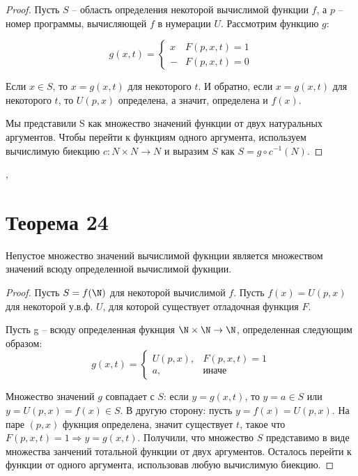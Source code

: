 \documentclass[a4paper,12pt]{article}
\begin{document}
    \begin{proof}
        Пусть $S$ -- область определения некоторой вычислимой функции $f$, а $p$ -- номер программы, вычисляющей $f$ в нумерации $U$. Рассмотрим функцию $g$:
        
        \begin{equation*}
        g(x, t) = 
        \begin{cases} 
        x & F(p, x, t) = 1\\
        -& F(p, x, t) = 0
        \end{cases}
        \end{equation*}
        
        Если $x \in S$, то $x = g(x, t)$ для некоторого $t$. И обратно, если $x = g(x, t)$ для
        некоторого $t$, то $U(p, x)$ определена, а значит, определена и $f(x)$.
        
        Мы представили S как множество значений функции от двух натуральных аргументов. Чтобы перейти к 
        функциям одного аргумента, используем вычислимую биекцию $c : N \times N \rightarrow N$ и выразим $S$ как $S = g \circ c^{-1}(N)$.
    \end{proof}
    \sep
    \section{Теорема 24}
    \begin{theorem}
        Непустое множество значений вычислимой фукнции является множеством значений всюду определенной вычислимой фукнции.
    \end{theorem}
    \begin{proof}
        Пусть $S = f(\N)$ для некоторой вычислимой $f$. Пусть $f(x) = U(p, x)$ для некоторой у.в.ф. $U$, для которой существует отладочная функция $F$.
        
        Пусть g -- всюду определенная фукнция $\N \times \N \rightarrow \N$, определенная следующим образом:
        \[
        g(x, t) =
        \begin{cases}
        U(p, x), & F(p, x, t) = 1 \\
        a,       & \text{иначе}
        \end{cases}
        \]
        
        Множество значений $g$ совпадает с $S$: если $y = g(x, t)$, то $y = a \in S$ или $y = U(p, x) = f(x) \in S$. В другую сторону: пусть $y = f(x) = U(p, x)$. На паре $(p, x)$ фукнция определена, значит существует $t$, такое что $F(p, x, t) = 1 \Rightarrow y = g(x, t)$. Получили, что множество $S$ представимо в виде множества занчений тотальной функции от двух аргументов. Осталось перейти к функции от одного аргумента, использовав любую вычислимую биекцию.  
        
    \end{proof}
\end{document}
